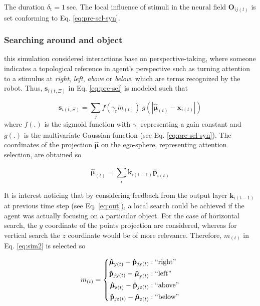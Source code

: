 \documentclass[letterpaper, 10 pt, conference]{ieeeconf}  %
\begin{document}
	\noindent The duration $\delta_\mathrm{t} = 1\ \mathrm{sec}$. The local influence of stimuli in the neural field $\mathbf{O}_{ij(t)}$ is set conforming to Eq. \eqref{eq:pre-sel-syn}.
	
	\subsubsection{Searching around and object} this simulation considered interactions base on perspective-taking, where someone indicates a topological reference in agent's perspective such as turning attention to a stimulus at \textit{right}, \textit{left}, \textit{above} or \textit{below}, which are terms recognized by the robot. Thus, $\mathbf{s}_{i(t,\Xi)}$ in Eq. \eqref{eq:pre-sel} is modeled such that
	
	\begin{equation}
	\mathbf{s}_{i(t,\Xi)} = \sum_{j}^{} f\left(\gamma_\mathrm{r}m_{(t)}\right)\ g\left(\left|\boldsymbol{\hat{\mu}}_{(t)} - \mathbf{x}_{i(t)}\right|\right)
	\label{eq:sim2}
	\end{equation}
	\noindent where $f(.)$ is the sigmoid function with $\gamma_\mathrm{r}$ representing a gain constant and $g(.)$ is the multivariate Gaussian function (see Eq. \eqref{eq:pre-sel-syn}). The coordinates of the projection $\boldsymbol{\hat{\mu}}$ on the ego-sphere, representing attention selection, are obtained so 
	
	\begin{equation}
	\boldsymbol{\hat{\mu}}_{(t)} = \sum_{i}^{}\mathbf{k}_\mathrm{i(t-1)}\mathbf{\hat{p}}_{i(t)}
	\label{eq:sim2-mu}
	\end{equation}
	
	It is interest noticing that by considering feedback from the output layer $\mathbf{k}_\mathrm{i(t-1)}$ at previous time step (see Eq. \eqref{eq:out}), a local search could be achieved if the agent was actually focusing on a particular object. For the case of horizontal search, the $y$ coordinate of the points projection are considered, whereas for vertical search the $z$ coordinate would be of more relevance. Therefore, $m_{(t)}$ in Eq. \eqref{eq:sim2} is selected so
	
	\begin{equation}
	m_{(t)} = 
	\left\{
	\begin{split}
	\boldsymbol{\hat{\mu}}_{\mathrm{y}(t)}- \mathbf{\hat{p}}_{j\mathrm{y}(t)} & : \mathrm{``right"}\\
	\mathbf{\hat{p}}_{j\mathrm{y}(t)} - \boldsymbol{\hat{\mu}}_{\mathrm{y}(t)}& : \mathrm{``left"}\\
	\boldsymbol{\hat{\mu}}_{\mathrm{z}(t)}- \mathbf{\hat{p}}_{j\mathrm{z}(t)} & : \mathrm{``above"}\\
	\mathbf{\hat{p}}_{j\mathrm{z}(t)} - \boldsymbol{\hat{\mu}}_{\mathrm{z}(t)} & : \mathrm{``below"}\\
	\end{split}\right.
	\label{eq:sim2-m}
	\end{equation}
	
\end{document}

